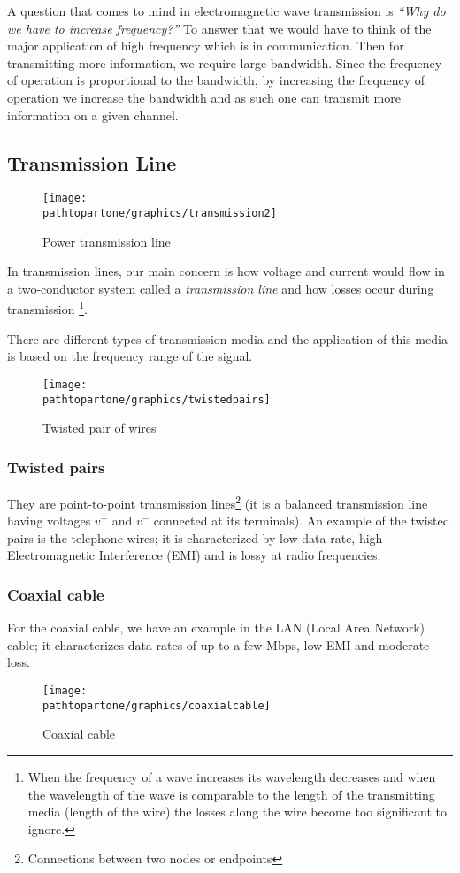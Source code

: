 A question that comes to mind in electromagnetic wave transmission is \emph{\textquotedblleft Why do we have to increase frequency?\textquotedblright} \hspace{0.03in} To answer that we would have to think of the major application of high frequency which is in communication. Then for transmitting more information, we require large bandwidth. Since the frequency of operation is proportional to the bandwidth, by increasing the frequency of operation we increase the bandwidth and as such one can transmit more information on a given channel.

\subsection{Transmission Line}
\begin{figure}[h]
\centering
\texttt{[image: \\pathtopartone/graphics/transmission2]}
\caption{Power transmission line}
\end{figure}

In transmission lines, our main concern is how voltage and current would flow in a two-conductor system called a \textit{transmission line} and how losses occur during transmission \footnote{
When the frequency of a wave increases its wavelength decreases and when the wavelength of the wave is comparable to the length of the transmitting media (length of the wire) the losses along the wire become too significant to ignore.
}.

There are different types of transmission media and the application of this media is based on the frequency range of the signal.
\begin{figure}[h]
\centering
\texttt{[image: \\pathtopartone/graphics/twistedpairs]}
\caption{Twisted pair of wires}
\end{figure} 

\subsubsection{Twisted pairs}
They are point-to-point transmission lines\footnote{
Connections between two nodes or endpoints
} (it is a balanced transmission line having voltages $v^{+}$ and $v^{-}$ connected at its terminals). An example of the twisted pairs is the telephone wires; it is characterized by low data rate, high Electromagnetic Interference (EMI) and is lossy at radio frequencies.

\subsubsection{Coaxial cable}
For the coaxial cable, we have an example in the LAN (Local Area Network) cable; it characterizes data rates of up to a few Mbps, low EMI and moderate loss.
\begin{figure}[h]
\centering
\texttt{[image: \\pathtopartone/graphics/coaxialcable]}
\caption{Coaxial cable}
\end{figure}

